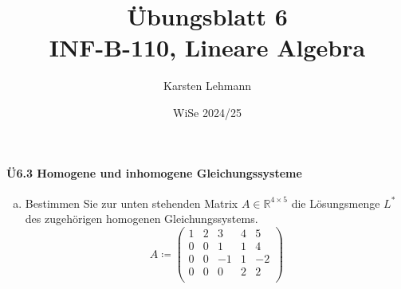 \documentclass{scrreprt}
\author{Karsten Lehmann}
\date{WiSe 2024/25}
\title{Übungsblatt 6\\INF-B-110, Lineare Algebra}
\begin{document}
\paragraph{Ü6.3 Homogene und inhomogene Gleichungssysteme}
\begin{enumerate}[(a)]
\item Bestimmen Sie zur unten stehenden Matrix $A \in \mathbb{R}^{4 \times 5}$
  die Lösungsmenge $L^*$ des zugehörigen homogenen Gleichungssystems.
  \[
    A \coloneqq \begin{pmatrix}
      1 & 2 & 3  & 4 & 5  \\
      0 & 0 & 1  & 1 & 4  \\
      0 & 0 & -1 & 1 & -2 \\
      0 & 0 & 0  & 2 & 2  \\
    \end{pmatrix}
  \]


\end{enumerate}
\end{document}
